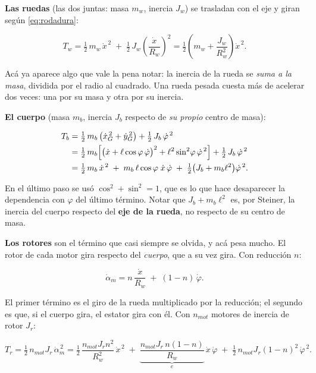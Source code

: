 \documentclass[11pt,a4paper]{report}
\begin{document}
\textbf{Las ruedas} (las dos juntas: masa $m_w$, inercia $J_w$) se trasladan con el eje y giran
según \eqref{eq:rodadura}:

\begin{equation}
T_w = \tfrac12\,m_w\,\dot x^{\,2} \;+\; \tfrac12\,J_w\left(\frac{\dot x}{R_w}\right)^{\!2}
    = \tfrac12\left(m_w + \frac{J_w}{R_w^2}\right)\dot x^{\,2}.
\end{equation}

Acá ya aparece algo que vale la pena notar: la inercia de la rueda se \emph{suma a la masa},
dividida por el radio al cuadrado. Una rueda pesada cuesta más de acelerar dos veces: una por
su masa y otra por su inercia.

\textbf{El cuerpo} (masa $m_b$, inercia $J_b$ respecto de \emph{su propio} centro de masa):

\begin{align}
T_b &= \tfrac12\,m_b\left(\dot x_G^{\,2} + \dot y_G^{\,2}\right) + \tfrac12\,J_b\,\dot\varphi^{\,2}\\
    &= \tfrac12\,m_b\Bigl[\bigl(\dot x + \ell\cos\varphi\,\dot\varphi\bigr)^2
       + \ell^2\sin^2\!\varphi\,\dot\varphi^{\,2}\Bigr] + \tfrac12\,J_b\,\dot\varphi^{\,2}\\
    &= \tfrac12\,m_b\,\dot x^{\,2}
       \;+\; m_b\,\ell\cos\varphi\;\dot x\,\dot\varphi
       \;+\; \tfrac12\bigl(J_b + m_b\ell^2\bigr)\dot\varphi^{\,2}.
\end{align}

En el último paso se usó $\cos^2 + \sin^2 = 1$, que es lo que hace desaparecer la dependencia
con $\varphi$ del último término. Notar que $J_b + m_b\ell^2$ es, por Steiner, la inercia del
cuerpo respecto del \textbf{eje de la rueda}, no respecto de su centro de masa.

\textbf{Los rotores} son el término que casi siempre se olvida, y acá pesa mucho. El rotor de
cada motor gira respecto del \emph{cuerpo}, que a su vez gira. Con reducción $n$:

\begin{equation}\label{eq:rotor}
\dot\alpha_m = n\,\frac{\dot x}{R_w} \;+\; (1-n)\,\dot\varphi .
\end{equation}

El primer término es el giro de la rueda multiplicado por la reducción; el segundo es que, si
el cuerpo gira, el estator gira con él. Con $n_{mot}$ motores de inercia de rotor $J_r$:

\begin{equation}
T_r = \tfrac12\,n_{mot}J_r\,\dot\alpha_m^{\,2}
= \tfrac12\,\frac{n_{mot}J_r n^2}{R_w^2}\,\dot x^{\,2}
\;+\; \underbrace{\frac{n_{mot}J_r\,n(1-n)}{R_w}}_{\textstyle e}\,\dot x\,\dot\varphi
\;+\; \tfrac12\,n_{mot}J_r(1-n)^2\,\dot\varphi^{\,2}.
\end{equation}
\end{document}
